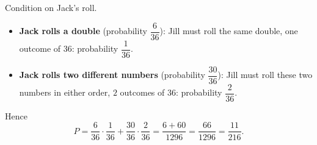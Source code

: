 Condition on Jack's roll.
\begin{itemize}
\item \textbf{Jack rolls a double} (probability $\dfrac{6}{36}$): Jill must roll the same double, one outcome of $36$: probability $\dfrac{1}{36}$.
\item \textbf{Jack rolls two different numbers} (probability $\dfrac{30}{36}$): Jill must roll these two numbers in either order, $2$ outcomes of $36$: probability $\dfrac{2}{36}$.
\end{itemize}
Hence
\[
P=\dfrac{6}{36}\cdot\dfrac{1}{36}+\dfrac{30}{36}\cdot\dfrac{2}{36}=\dfrac{6+60}{1296}=\dfrac{66}{1296}=\boxed{\dfrac{11}{216}}.
\]
